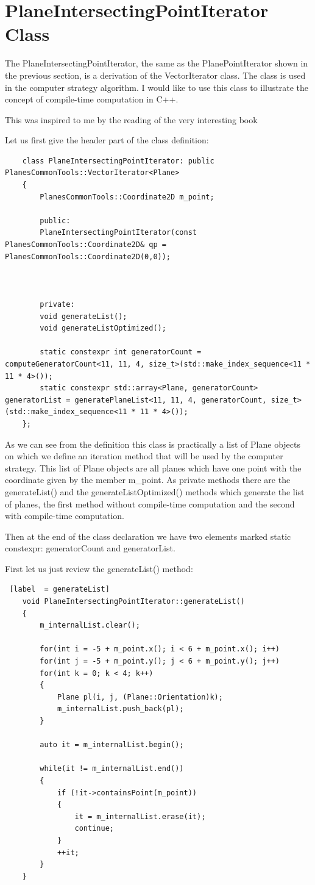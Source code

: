 \section{PlaneIntersectingPointIterator Class}

The PlaneIntersectingPointIterator, the same as the PlanePointIterator shown in the previous section, is a derivation of the VectorIterator class. The class is used in the computer strategy algorithm. I would like to use this class to illustrate the concept of compile-time computation in C++.

This was inspired to me by the reading of the very interesting book \cite{morales2025}

Let us first give the header part of the class definition:

\begin{lstlisting}
	class PlaneIntersectingPointIterator: public PlanesCommonTools::VectorIterator<Plane>
	{
		PlanesCommonTools::Coordinate2D m_point;
		
		public:
		PlaneIntersectingPointIterator(const PlanesCommonTools::Coordinate2D& qp = PlanesCommonTools::Coordinate2D(0,0));
		
		
		
		private:
		void generateList();
		void generateListOptimized();
		
		static constexpr int generatorCount = computeGeneratorCount<11, 11, 4, size_t>(std::make_index_sequence<11 * 11 * 4>());
		static constexpr std::array<Plane, generatorCount> generatorList = generatePlaneList<11, 11, 4, generatorCount, size_t>(std::make_index_sequence<11 * 11 * 4>());
	};
\end{lstlisting}

As we can see from the definition this class is practically a list of Plane objects on which we define an iteration method that will be used by the computer strategy. This list of Plane objects are all planes which have one point with the coordinate given by the member m\_point. As private methods there are the generateList() and the generateListOptimized() methods which generate the list of planes, the first method without compile-time computation and the second with compile-time computation.

Then at the end of the class declaration we have two elements marked static constexpr: generatorCount and generatorList.

First let us just review the generateList() method:

\begin{lstlisting} [label  = generateList]
	void PlaneIntersectingPointIterator::generateList()
	{
		m_internalList.clear();
		
		for(int i = -5 + m_point.x(); i < 6 + m_point.x(); i++)
		for(int j = -5 + m_point.y(); j < 6 + m_point.y(); j++)
		for(int k = 0; k < 4; k++)
		{
			Plane pl(i, j, (Plane::Orientation)k);
			m_internalList.push_back(pl);
		}
		
		auto it = m_internalList.begin();
		
		while(it != m_internalList.end())
		{
			if (!it->containsPoint(m_point))
			{
				it = m_internalList.erase(it);
				continue;
			}
			++it;
		}
	}
\end{lstlisting}

